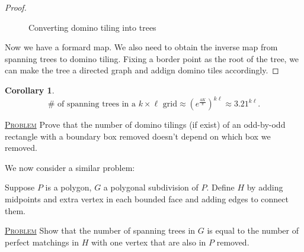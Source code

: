 \documentclass{report}
\newcommand{\fancyem}[1]{\underline{\textsc{#1}}}
\newtheorem{corollary}{Corollary}[section]
\theoremstyle{definition}
\theoremstyle{remark}
\numberwithin{equation}{section}
\begin{document}
\begin{proof}
\begin{figure}[h]
        \caption{Converting domino tiling into trees}
        \label{fig:treetotiling}
    \end{figure}

Now we have a formard map. We also need to obtain the inverse map from spanning trees to domino tiling. Fixing a border point as the root of the tree, we can make the tree a directed graph and addign domino tiles accordingly.
\end{proof}

\begin{corollary}
    \[
        \# \text{ of spanning trees in a $k \times \ell$ grid} \approx \left(e^\frac{4K}{\pi}\right)^{k\ell} \approx 3.21^{k\ell}.
    \]
\end{corollary}

\fancyem{Problem} Prove that the number of domino tilings (if exist) of an odd-by-odd rectangle with a boundary box removed doesn't depend on which box we removed.

We now consider a similar problem:

Suppose $P$ is a polygon, $G$ a polygonal subdivision of $P$. Define $H$ by adding midpoints and extra vertex in each bounded face and adding edges to connect them.

\fancyem{Problem} Show that the number of spanning trees in $G$ is equal to the number of perfect matchings in $H$ with one vertex that are also in $P$ removed.
\end{document}
